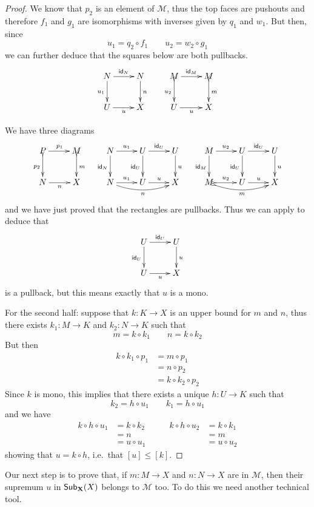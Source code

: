 \begin{proof}
	We know that $p_2$ is an element of $\mathcal{M}$, thus  the top faces are pushouts and therefore $f_1$ and $g_1$ are isomorphisms with inverses given by $q_1$ and $w_1$.  But then, since
	\[u_1=q_2\circ f_1 \qquad u_2=w_2\circ g_1\]
	we can further deduce that the squares below  are both pullbacks.
	\[\xymatrix{N \ar[r]^{\id{N}} \ar[d]_{u_1} & N\ar[d]^{n} & M \ar[r]^{\id{M}} \ar@{>->}[d]_{u_2}& M\ar@{>->}[d]^{m}\\
		U \ar[r]_{u}& X & U \ar[r]_{u}& X}\]
	
	We have three diagrams 
	\[\xymatrix{P\ar@{>->}[d]_{p_2} \ar[r]^{p_1} & M \ar@{>->}[d]^{m}  & N \ar[d]_{\id{N}} \ar[r]^{u_1}& U\ar[d]_{\id{U}} \ar[r]^{\id{U}}  & U \ar[d]^{u} &  M \ar[d]_{\id{M}} \ar[r]^{u_2}& U \ar[r]^{\id{U}} \ar[d]_{\id{U}}  & U \ar[d]^{u}\\N \ar[r]_{n} & X & N \ar@/_.3cm/[rr]_{n}\ar[r]^{u_1} & U  \ar[r]^u  &X & M\ar@{>->}@/_.3cm/[rr]_{m}\ar@{>->}[r]^{u_2} & U  \ar[r]^u  &X }\]
	and we have just proved that the rectangles are pullbacks. Thus we can apply  to deduce that 
	\[\xymatrix{ U \ar[r]^{\id{U}} \ar[d]_{\id{U}}  & U \ar[d]^{u}\\ U  \ar[r]_u  &X }\]
	is a pullback, but this means exactly that $u$ is a mono.
	
	For the second half: suppose that $k\colon K\to X$ is an upper bound for $m$ and $n$, thus there exists $k_1\colon M\to K$ and $k_2\colon N\to K$ such that
	\[m=k\circ k_1 \qquad n=k\circ k_2\] 
	But then
	\begin{align*}
		k\circ k_1 \circ p_1 &= m\circ p_1\\&= n\circ p_2\\&= k\circ k_2\circ p_2
	\end{align*}
	Since $k$ is mono, this implies that there exists a unique $h\colon U\to K$ such that 
	\[k_2=h\circ u_1 \qquad k_1=h\circ u_1\]
	and we have
	\[\begin{split}
		k\circ h \circ u_1&=k\circ k_2\\&=n \\&=u \circ u_1 
	\end{split}\qquad 
	\begin{split}
		k\circ h \circ u_2&=k\circ k_1\\&=m \\&=u \circ u_2 
	\end{split} \]
	showing that $u=k\circ h$, i.e.~that $[u]\leq [k]$.
\end{proof}
 
Our next step is to prove that, if $m\colon M\to X$ and $n\colon N\to X$ are in $\mathcal{M}$, then their supremum $u$ in $\mathsf{Sub}_{\textbf {\textup{X}}}(X)$ belongs to $\mathcal{M}$ too. To do this we need another technical tool.
 
